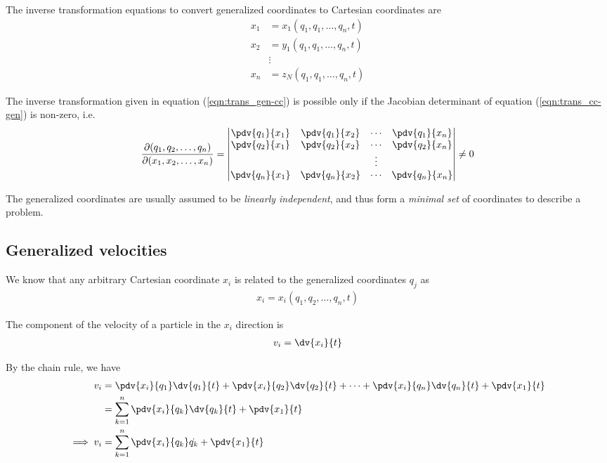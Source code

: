 The inverse transformation equations to convert generalized coordinates to Cartesian coordinates are
\begin{equation} \label{eqn:trans_gen-cc}
	\begin{aligned}
		x_1&=x_1(q_1,q_1,\dots,q_n,t) \\
		x_2&=y_1(q_1,q_1,\dots,q_n,t) \\
		&\vdots \\
		x_n&=z_N(q_1,q_1,\dots,q_n,t)
	\end{aligned}
\end{equation}

The inverse transformation given in equation (\ref{eqn:trans_gen-cc}) is possible only if the Jacobian determinant of equation (\ref{eqn:trans_cc-gen}) is non-zero, i.e.
\begin{align*}
	\dfrac{\partial(q_1,q_2,\dots,q_n)}{\partial(x_1,x_2,\dots,x_n)}=\begin{vmatrix}
		{\pdv{q_1}{x_1}} & {\pdv{q_1}{x_2}} & {\cdots} & {\pdv{q_1}{x_n}} \\
		{\pdv{q_2}{x_1}} & {\pdv{q_2}{x_2}} & {\cdots} & {\pdv{q_2}{x_n}} \\
		{} & {} & {\vdots} & {} \\
		{\pdv{q_n}{x_1}} & {\pdv{q_n}{x_2}} & {\cdots} & {\pdv{q_n}{x_n}}
	\end{vmatrix}\neq 0
\end{align*}

The generalized coordinates are usually assumed to be \textit{linearly independent}, and thus form a \textit{minimal set} of coordinates to describe a problem.

\subsection{Generalized velocities}
We know that any arbitrary Cartesian coordinate $x_i$ is related to the generalized coordinates $q_j$ as
\begin{align*}
	x_i=x_i(q_1,q_2,\dots,q_n,t)
\end{align*}

The component of the velocity of a particle in the $x_i$ direction is
\begin{align*}
	v_i=\dv{x_i}{t}
\end{align*}

By the chain rule, we have
\begin{align}
	v_i&=\pdv{x_i}{q_1}\dv{q_1}{t}+\pdv{x_i}{q_2}\dv{q_2}{t}+\cdots+\pdv{x_i}{q_n}\dv{q_n}{t}+\pdv{x_1}{t} \nonumber\\
	&=\sum_{k=1}^{n}{\pdv{x_i}{q_k}\dv{q_k}{t}}+\pdv{x_1}{t} \nonumber\\
	\implies v_i&=\sum_{k=1}^{n}{\pdv{x_i}{q_k}\dot{q_k}}+\pdv{x_1}{t} \label{eqn:gen-vel-01}
\end{align}

